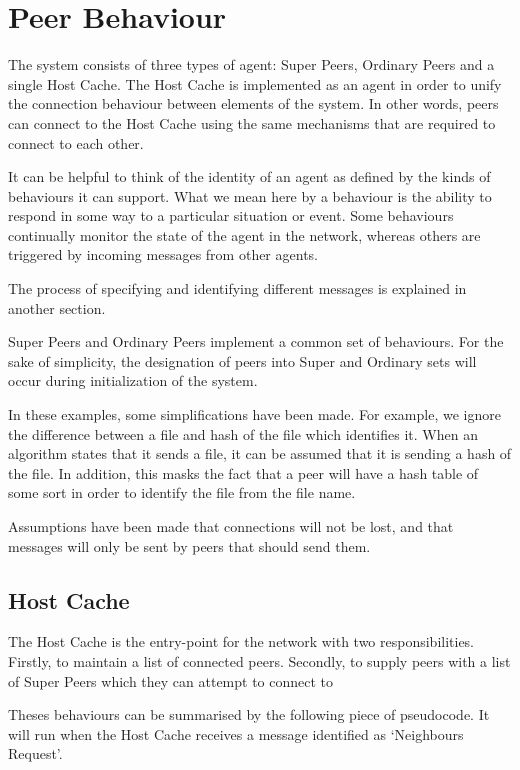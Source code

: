 \section{Peer Behaviour}

\secttoc

The system consists of three types of agent: Super Peers, Ordinary Peers and a
single Host Cache.  The Host Cache is implemented as an agent in order to unify
the connection behaviour between elements of the system.  In other words, peers
can connect to the Host Cache using the same mechanisms that are required to
connect to each other.

It can be helpful to think of the identity of an agent as defined by the kinds
of behaviours it can support. What we mean here by a behaviour is the ability to
respond in some way to a particular situation or event.  Some behaviours
continually monitor the state of the agent in the network, whereas others
are triggered by incoming messages from other agents.

The process of specifying and identifying different messages is explained in
another section.

Super Peers and Ordinary Peers implement a common set of behaviours. For
the sake of simplicity, the designation of peers into Super and Ordinary sets
will occur during initialization of the system.

In these examples, some simplifications have been made.  For example, we ignore
the difference between a file and hash of the file which identifies it. When an
algorithm states that it sends a file, it can be assumed that it is sending a
hash of the file.  In addition, this masks the fact that a peer will have a hash
table of some sort in order to identify the file from the file name.

Assumptions have been made that connections will not be lost, and that messages
will only be sent by peers that should send them.

\subsection{Host Cache}

The Host Cache is the entry-point for the network with two responsibilities.
Firstly, to maintain a list of connected peers. Secondly, to supply peers with a
list of Super Peers which they can attempt to connect to

Theses behaviours can be summarised by the following piece of pseudocode. It
will run when the Host Cache receives a message identified as `Neighbours
Request'.

